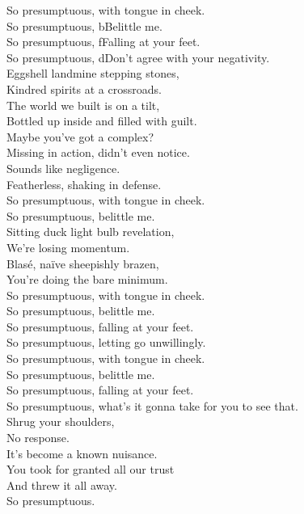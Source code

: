 


So presumptuous, with tongue in cheek. \\
So presumptuous, bBelittle me. \\
So presumptuous, fFalling at your feet. \\
So presumptuous, dDon't agree with your negativity. \\

Eggshell landmine stepping stones, \\
Kindred spirits at a crossroads. \\
The world we built is on a tilt, \\
Bottled up inside and filled with guilt. \\
Maybe you've got a  complex? \\
Missing in action, didn't even notice. \\
Sounds like negligence. \\
Featherless, shaking in defense. \\

So presumptuous, with tongue in cheek. \\
So presumptuous, belittle me. \\

Sitting duck light bulb revelation, \\
We're losing momentum. \\
Blasé, naïve sheepishly brazen, \\
You're doing the bare minimum. \\

So presumptuous, with tongue in cheek. \\
So presumptuous, belittle me. \\
So presumptuous, falling at your feet. \\
So presumptuous, letting go unwillingly. \\

So presumptuous, with tongue in cheek. \\
So presumptuous, belittle me. \\
So presumptuous, falling at your feet. \\
So presumptuous, what's it gonna take for you to see that. \\

Shrug your shoulders, \\
No response. \\
It's become a known nuisance. \\
You took for granted all our trust \\
And threw it all away. \\
So presumptuous. \\

